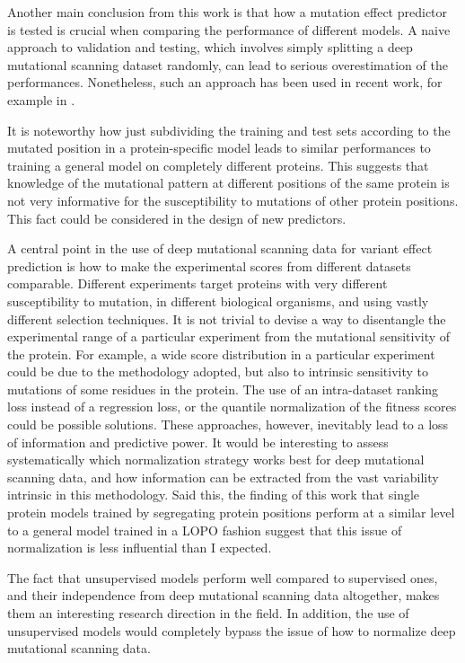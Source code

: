 Another main conclusion from this work is that how a mutation effect predictor is tested is crucial when comparing the performance of different models.
A naive approach to validation and testing, which involves simply splitting a deep mutational scanning dataset randomly, can lead to serious overestimation of the performances.
Nonetheless, such an approach has been used in recent work, for example in \textcite{Gelman2020}.

It is noteworthy how just subdividing the training and test sets according to the mutated position in a protein-specific model leads to similar performances to training a general model on completely different proteins.
This suggests that knowledge of the mutational pattern at different positions of the same protein is not very informative for the susceptibility to mutations of other protein positions.
This fact could be considered in the design of new predictors.

A central point in the use of deep mutational scanning data for variant effect prediction is how to make the experimental scores from different datasets comparable.
Different experiments target proteins with very different susceptibility to mutation, in different biological organisms, and using vastly different selection techniques.
It is not trivial to devise a way to disentangle the experimental range of a particular experiment from the mutational sensitivity of the protein.
For example, a wide score distribution in a particular experiment could be due to the methodology adopted, but also to intrinsic sensitivity to mutations of some residues in the protein.
The use of an intra-dataset ranking loss instead of a regression loss, or the quantile normalization of the fitness scores could be possible solutions.
These approaches, however, inevitably lead to a loss of information and predictive power.
It would be interesting to assess systematically which normalization strategy works best for deep mutational scanning data, and how information can be extracted from the vast variability intrinsic in this methodology.
Said this, the finding of this work that single protein models trained by segregating protein positions perform at a similar level to a general model trained in a LOPO fashion suggest that this issue of normalization is less influential than I expected.

The fact that unsupervised models perform well compared to supervised ones, and their independence from deep mutational scanning data altogether, makes them an interesting research direction in the field.
In addition, the use of unsupervised models would completely bypass the issue of how to normalize deep mutational scanning data.

